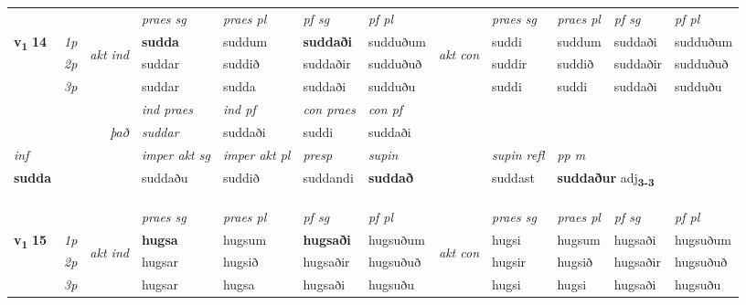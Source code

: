 \begin{longtable}[l]{X>{\footnotesize\itshape}llXXXXlXXXX}
 & &   & \textit{praes sg}  & \textit{praes pl}    & \textit{ pf sg} & \textit{pf pl} & & \textit{praes sg}  & \textit{praes pl}    & \textit{pf sg} & \textit{pf pl }  \\ \cmidrule{4-7} \cmidrule{9-12}
 \multirow{2}{*}{{{\textbf{v{\textsubscript{1}}} \Large{\textbf{14}}}}}  & 1p & \multirow{3}{*}{\begin{turn}{90}\textit{akt ind}\end{turn}} & \textbf{sudda} & suddum & \textbf{suddaði} & sudduðum & \multirow{3}{*}{\begin{turn}{90}\textit{akt con}\end{turn}} &suddi & suddum & suddaði & sudduðum\\*
 & 2p &  &  suddar  & suddið & suddaðir & sudduðuð & & suddir & suddið & suddaðir & sudduðuð \\*
 & 3p &  & suddar & sudda & suddaði & sudduðu & & suddi & suddi& suddaði & sudduðu \\*
\cmidrule{4-7} \cmidrule{9-12}

   && &  \textit{ind praes} & \textit{ind pf} & \textit{con praes} & \textit{con pf} \\*
\multicolumn{3}{r}{\textit{það}} & suddar & suddaði & suddi & suddaði \\*

\cmidrule{4-7}
   {\textit{inf}} & &  & \textit{imper akt sg} & \textit{imper akt pl}   & \textit{presp} & \textit{supin} && \textit{supin refl} & \textit{pp m} \\*
  {\textbf{sudda}} & && suddaðu  & suddið   & suddandi &  \textbf{suddað} && suddast & \multicolumn{2}{l}{\textbf{suddaður} adj\textbf{\textsubscript{3-3}}} \\*

\midrule


  & \\*
   & \\*
  & \\
   \midrule
 & &   & \textit{praes sg}  & \textit{praes pl}    & \textit{ pf sg} & \textit{pf pl} & & \textit{praes sg}  & \textit{praes pl}    & \textit{pf sg} & \textit{pf pl }  \\ \cmidrule{4-7} \cmidrule{9-12}
 \multirow{2}{*}{{{\textbf{v{\textsubscript{1}}} \Large{\textbf{15}}}}}  & 1p & \multirow{3}{*}{\begin{turn}{90}\textit{akt ind}\end{turn}} & \textbf{hugsa} & hugsum & \textbf{hugsaði} & hugsuðum & \multirow{3}{*}{\begin{turn}{90}\textit{akt con}\end{turn}} &hugsi & hugsum & hugsaði & hugsuðum\\*
 & 2p &  &  hugsar  & hugsið & hugsaðir & hugsuðuð & & hugsir & hugsið & hugsaðir & hugsuðuð \\*
 & 3p &  & hugsar & hugsa & hugsaði & hugsuðu & & hugsi & hugsi& hugsaði & hugsuðu \\*
\cmidrule{4-7} \cmidrule{9-12}


\end{longtable}
